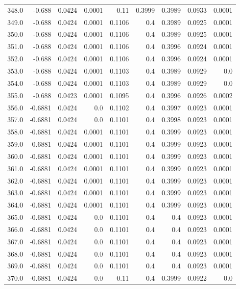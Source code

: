 \begin{longtable}{lrrrrrrrr}
348.0 & -0.688 & 0.0424 & 0.0001 & 0.11 & 0.3999 & 0.3989 & 0.0933 & 0.0001 \\
349.0 & -0.688 & 0.0424 & 0.0001 & 0.1106 & 0.4 & 0.3989 & 0.0925 & 0.0001 \\
350.0 & -0.688 & 0.0424 & 0.0001 & 0.1106 & 0.4 & 0.3989 & 0.0925 & 0.0001 \\
351.0 & -0.688 & 0.0424 & 0.0001 & 0.1106 & 0.4 & 0.3996 & 0.0924 & 0.0001 \\
352.0 & -0.688 & 0.0424 & 0.0001 & 0.1106 & 0.4 & 0.3996 & 0.0924 & 0.0001 \\
353.0 & -0.688 & 0.0424 & 0.0001 & 0.1103 & 0.4 & 0.3989 & 0.0929 & 0.0 \\
354.0 & -0.688 & 0.0424 & 0.0001 & 0.1103 & 0.4 & 0.3989 & 0.0929 & 0.0 \\
355.0 & -0.688 & 0.0423 & 0.0001 & 0.1095 & 0.4 & 0.3996 & 0.0926 & 0.0002 \\
356.0 & -0.6881 & 0.0424 & 0.0 & 0.1102 & 0.4 & 0.3997 & 0.0923 & 0.0001 \\
357.0 & -0.6881 & 0.0424 & 0.0 & 0.1101 & 0.4 & 0.3998 & 0.0923 & 0.0001 \\
358.0 & -0.6881 & 0.0424 & 0.0001 & 0.1101 & 0.4 & 0.3999 & 0.0923 & 0.0001 \\
359.0 & -0.6881 & 0.0424 & 0.0001 & 0.1101 & 0.4 & 0.3999 & 0.0923 & 0.0001 \\
360.0 & -0.6881 & 0.0424 & 0.0001 & 0.1101 & 0.4 & 0.3999 & 0.0923 & 0.0001 \\
361.0 & -0.6881 & 0.0424 & 0.0001 & 0.1101 & 0.4 & 0.3999 & 0.0923 & 0.0001 \\
362.0 & -0.6881 & 0.0424 & 0.0001 & 0.1101 & 0.4 & 0.3999 & 0.0923 & 0.0001 \\
363.0 & -0.6881 & 0.0424 & 0.0001 & 0.1101 & 0.4 & 0.3999 & 0.0923 & 0.0001 \\
364.0 & -0.6881 & 0.0424 & 0.0001 & 0.1101 & 0.4 & 0.3999 & 0.0923 & 0.0001 \\
365.0 & -0.6881 & 0.0424 & 0.0 & 0.1101 & 0.4 & 0.4 & 0.0923 & 0.0001 \\
366.0 & -0.6881 & 0.0424 & 0.0 & 0.1101 & 0.4 & 0.4 & 0.0923 & 0.0001 \\
367.0 & -0.6881 & 0.0424 & 0.0 & 0.1101 & 0.4 & 0.4 & 0.0923 & 0.0001 \\
368.0 & -0.6881 & 0.0424 & 0.0 & 0.1101 & 0.4 & 0.4 & 0.0923 & 0.0001 \\
369.0 & -0.6881 & 0.0424 & 0.0 & 0.1101 & 0.4 & 0.4 & 0.0923 & 0.0001 \\
370.0 & -0.6881 & 0.0424 & 0.0 & 0.11 & 0.4 & 0.3999 & 0.0922 & 0.0 \\

\end{longtable}
